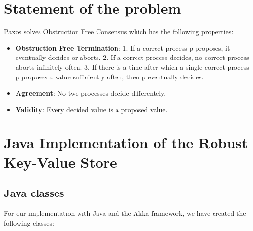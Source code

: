 \documentclass{article}
\begin{document}


\tableofcontents
\listoffigures

\newpage

\section{Statement of the problem}

Paxos solves Obstruction Free Consensus which has the following properties: 
\begin{itemize}
    \item \textbf{Obstruction Free Termination}: 1. If a correct process p proposes, it eventually decides or aborts.
    2. If a correct process decides, no correct process aborts infinitely often.
    3. If there is a time after which a single correct process p proposes a value sufficiently often, then p eventually decides.
    \item \textbf{Agreement}: No two processes decide differentely.
    \item \textbf{Validity}: Every decided value is a proposed value.
\end{itemize}

\section{Java Implementation of the Robust Key-Value Store}

\subsection{Java classes}
For our implementation with Java and the Akka framework, we have created the following classes:
\end{document}
